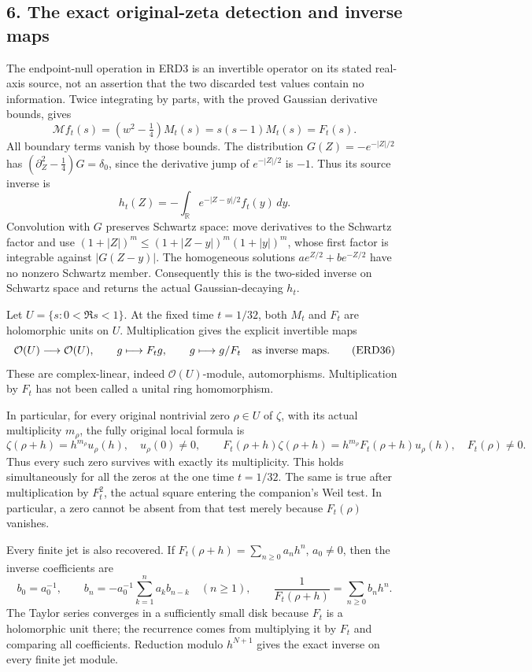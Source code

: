 \documentclass[
  10pt,
  a4paper,
]{article}
\begin{document}
\subsection{6. The exact original-zeta detection and inverse
maps}\label{the-exact-original-zeta-detection-and-inverse-maps}

The endpoint-null operation in ERD3 is an invertible operator on its
stated real-axis source, not an assertion that the two discarded test
values contain no information. Twice integrating by parts, with the
proved Gaussian derivative bounds, gives \[
 \mathcal M f_t(s)
     =(w^2-\tfrac14)M_t(s)=s(s-1)M_t(s)=F_t(s).
 \tag{ERD34}
\] All boundary terms vanish by those bounds. The distribution
\(G(Z)=-e^{-|Z|/2}\) has \((\partial_Z^2-\tfrac14)G=\delta_0\), since
the derivative jump of \(e^{-|Z|/2}\) is \(-1\). Thus its source inverse
is \[
 h_t(Z)=-\int_{\mathbb R}e^{-|Z-y|/2}f_t(y)\,dy.
 \tag{ERD35}
\] Convolution with \(G\) preserves Schwartz space: move derivatives to
the Schwartz factor and use \((1+|Z|)^m\le(1+|Z-y|)^m(1+|y|)^m\), whose
first factor is integrable against \(|G(Z-y)|\). The homogeneous
solutions \(a e^{Z/2}+b e^{-Z/2}\) have no nonzero Schwartz member.
Consequently this is the two-sided inverse on Schwartz space and returns
the actual Gaussian-decaying \(h_t\).

Let \(U=\{s:0<\Re s<1\}\). At the fixed time \(t=1/32\), both \(M_t\)
and \(F_t\) are holomorphic units on \(U\). Multiplication gives the
explicit invertible maps \[
 \mathcal O(U)\longrightarrow\mathcal O(U),\qquad
 g\longmapsto F_tg,\qquad
 g\longmapsto g/F_t
 \quad\hbox{as inverse maps}.
 \tag{ERD36}
\] These are complex-linear, indeed \(\mathcal O(U)\)-module,
automorphisms. Multiplication by \(F_t\) has not been called a unital
ring homomorphism.

In particular, for every original nontrivial zero \(\rho\in U\) of
\(\zeta\), with its actual multiplicity \(m_\rho\), the fully original
local formula is \[
 \zeta(\rho+h)=h^{m_\rho}u_\rho(h),\quad u_\rho(0)\ne0,
 \qquad
 F_t(\rho+h)\zeta(\rho+h)
       =h^{m_\rho}F_t(\rho+h)u_\rho(h),
 \quad F_t(\rho)\ne0.
 \tag{ERD37}
\] Thus every such zero survives with exactly its multiplicity. This
holds simultaneously for all the zeros at the one time \(t=1/32\). The
same is true after multiplication by \(F_t^2\), the actual square
entering the companion's Weil test. In particular, a zero cannot be
absent from that test merely because \(F_t(\rho)\) vanishes.

Every finite jet is also recovered. If
\(F_t(\rho+h)=\sum_{n\ge0}a_nh^n\), \(a_0\ne0\), then the inverse
coefficients are \[
 b_0=a_0^{-1},\qquad
 b_n=-a_0^{-1}\sum_{k=1}^{n}a_kb_{n-k}\quad(n\ge1),
 \qquad
 \frac1{F_t(\rho+h)}=\sum_{n\ge0}b_nh^n.
 \tag{ERD38}
\] The Taylor series converges in a sufficiently small disk because
\(F_t\) is a holomorphic unit there; the recurrence comes from
multiplying it by \(F_t\) and comparing all coefficients. Reduction
modulo \(h^{N+1}\) gives the exact inverse on every finite jet module.
\end{document}
